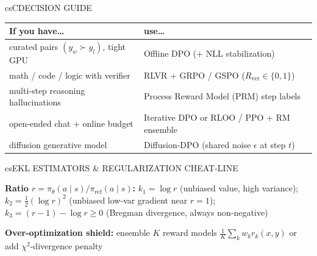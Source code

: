 \documentclass[../../../../master.tex]{subfiles}
\begin{document}
\begin{cscolumns}
\begin{cscard}{csC}{DECISION GUIDE}
  \renewcommand{\arraystretch}{1.22}\small
  \begin{tabular}{@{}>{\raggedright\arraybackslash}p{3.2cm}>{\raggedright\arraybackslash}p{4.6cm}@{}}
    \textbf{If you have\ldots} & \textbf{use\ldots}\\ \hline
    curated pairs $(y_w\succ y_l)$, tight GPU & Offline DPO (+ NLL stabilization)\\
    math / code / logic with verifier & RLVR + GRPO / GSPO ($R_{\mathrm{ver}}\in\{0,1\}$)\\
    multi-step reasoning hallucinations & Process Reward Model (PRM) step labels\\
    open-ended chat + online budget & Iterative DPO or RLOO / PPO + RM ensemble\\
    diffusion generative model & Diffusion-DPO (shared noise $\epsilon$ at step $t$)\\
  \end{tabular}
\end{cscard}

\begin{cscard}{csE}{KL ESTIMATORS \& REGULARIZATION CHEAT-LINE}
  \begin{csbul}
    \item \textbf{Ratio $r=\pi_\theta(a\mid s)/\pi_{\mathrm{ref}}(a\mid s)$:}
      $k_1=\log r$ (unbiased value, high variance);
      $k_2=\frac{1}{2}(\log r)^2$ (unbiased low-var gradient near $r{=}1$);
      $k_3=(r-1)-\log r\ge 0$ (Bregman divergence, always non-negative)
    \item \textbf{Over-optimization shield:} ensemble $K$ reward models $\frac{1}{K}\sum_k w_k r_k(x,y)$ or add $\chi^2$-divergence penalty
  \end{csbul}
\end{cscard}


\end{cscolumns}
\end{document}
